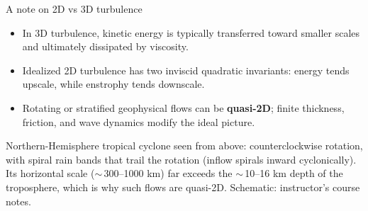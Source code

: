 \documentclass[aspectratio=169,11pt]{beamer}
\begin{document}
\begin{frame}{A note on 2D vs 3D turbulence}
\begin{itemize}
  \item In 3D turbulence, kinetic energy is typically transferred toward smaller scales and ultimately dissipated by viscosity.
  \item Idealized 2D turbulence has two inviscid quadratic invariants: energy tends upscale, while enstrophy tends downscale.
  \item Rotating or stratified geophysical flows can be \textbf{quasi-2D}; finite thickness, friction, and wave dynamics modify the ideal picture.
\end{itemize}

\vspace{0.25em}
\centering
{}

{\scriptsize Northern-Hemisphere tropical cyclone seen from above: counterclockwise rotation, with spiral rain bands that trail the rotation (inflow spirals inward cyclonically). Its horizontal scale ($\sim$\,300--1000 km) far exceeds the $\sim$\,10--16 km depth of the troposphere, which is why such flows are quasi-2D. Schematic: instructor's course notes.\par}

\end{frame}
\end{document}
